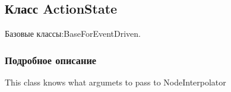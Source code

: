 \subsection{Класс Action\+State}
\label{class_win_form_animation2_d_1_1_action_state}


Базовые классы\+:Base\+For\+Event\+Driven.



\subsubsection{Подробное описание}
This class knows what argumets to pass to Node\+Interpolator 

